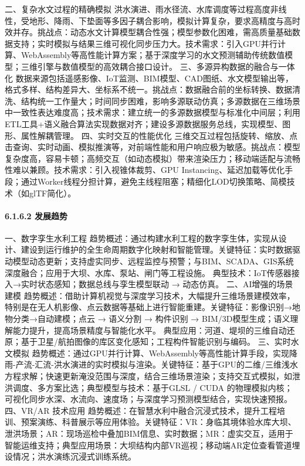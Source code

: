 {二、复杂水文过程的精确模拟
洪水演进、雨水径流、水库调度等过程高度非线性，受地形、降雨、下垫面等多因子耦合影响，模拟计算复杂，要求高精度与高时效并存。挑战点：动态水文计算模型耦合性强；模型参数化困难，需高质量基础数据支持；实时模拟与结果三维可视化同步压力大。技术需求：引入GPU并行计算、WebAssembly等高性能计算方案；基于深度学习的水文预测辅助传统数值模型；三维引擎与数值模型的高效耦合接口设计。
三、多源异构数据的融合与一体化
数据来源包括遥感影像、IoT监测、BIM模型、CAD图纸、水文模型输出等，格式多样、结构差异大、坐标系不统一。挑战点：数据融合前的坐标转换、数据清洗、结构统一工作量大；时间同步困难，影响多源联动仿真；多源数据在三维场景中一致性表达难度高；技术需求：建立统一的多源数据模型与标准化中间层；利用ETL工具+语义融合算法实现数据对齐；建设多源数据服务总线，实现模型、图形、属性解耦管理。
四、实时交互的性能优化
三维交互过程包括旋转、缩放、点击查询、实时动画、模拟推演等，对前端性能和用户响应极为敏感。挑战点：模型复杂度高，容易卡顿；高频交互（如动态模拟）带来渲染压力；移动端适配与流畅性难以兼顾。技术需求：引入视锥体裁剪、GPU
Instancing、延迟加载等优化手段；通过Worker线程分担计算，避免主线程阻塞；精细化LOD切换策略、简模技术（如glTF简化）。 \paragraph{6.1.6.2
发展趋势}\label{ux53d1ux5c55ux8d8bux52bf-1} 一、数字孪生水利工程
趋势概述：通过构建水利工程的数字孪生体，实现从设计、建设到运行维护的全生命周期数字化映射和智能管理。关键特征：实时数据驱动模型动态更新；支持虚实同步、远程监控与预警；与BIM、SCADA、GIS系统深度融合；应用于大坝、水库、泵站、闸门等工程设施。
典型技术：IoT传感器接入→实时状态感知；数据总线与孪生模型联动 → 动态仿真。 二、AI增强的场景建模
趋势概述：借助计算机视觉与深度学习技术，大幅提升三维场景建模效率，特别是在无人机影像、点云数据等基础上进行智能重建。关键特征：影像识别→地物分类→自动建模；点云 → 语义分割 → 构件识别 →
BIM/3D模型生成；语义理解能力提升，提高场景精度与智能化水平。 典型应用：河道、堤坝的三维自动还原；基于卫星/航拍图像的库区变化感知；工程构件智能识别与编码。 三、实时水文模拟
趋势概述：通过GPU并行计算、WebAssembly等高性能计算手段，实现降雨-产流-汇流-洪水演进的实时模拟与渲染。关键特征：基于GPU的二维/三维浅水方程求解；快速更新淹没范围与深度，结合三维场景渲染；支持交互式模拟，如泄洪调度、多方案比选；典型模型与技术：基于GLSL
/ CUDA 的物理模拟内核；可视化同步水深、水流向、速度场；与深度学习预测模型结合，实现快速预报。 四、VR/AR 技术应用
趋势概述：在智慧水利中融合沉浸式技术，提升工程培训、预案演练、科普展示等应用体验。关键特征：VR：身临其境体验水库大坝、泄洪场景；AR：现场巡检中叠加BIM信息、实时数据；MR：虚实交互，适用于智能运维支持；典型应用场景：大坝结构内部VR巡视；移动端AR定位查看管道埋设情况；洪水演练沉浸式训练系统。
}
